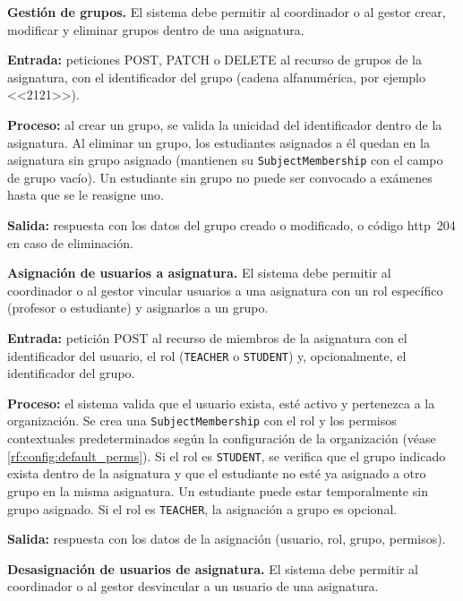 \begin{functional}
    \item \textbf{Gestión de grupos.} \label{rf:subjects:groups}
    El sistema debe permitir al coordinador o al gestor crear, modificar y eliminar grupos
    dentro de una asignatura.

    \textbf{Entrada:} peticiones POST, PATCH o DELETE al recurso de grupos de la
    asignatura, con el identificador del grupo (cadena alfanumérica, por ejemplo
    <<2121>>).

    \textbf{Proceso:} al crear un grupo, se valida la unicidad del identificador dentro de
    la asignatura. Al eliminar un grupo, los estudiantes asignados a él quedan en la
    asignatura sin grupo asignado (mantienen su \texttt{SubjectMembership} con el campo de
    grupo vacío). Un estudiante sin grupo no puede ser convocado a exámenes hasta que se le
    reasigne uno.

    \textbf{Salida:} respuesta con los datos del grupo creado o modificado, o código
    \acs{http}~204 en caso de eliminación.

    \item \textbf{Asignación de usuarios a asignatura.} \label{rf:subjects:assign}
    El sistema debe permitir al coordinador o al gestor vincular usuarios a una asignatura
    con un rol específico (profesor o estudiante) y asignarlos a un grupo.

    \textbf{Entrada:} petición POST al recurso de miembros de la asignatura con el
    identificador del usuario, el rol (\texttt{TEACHER} o \texttt{STUDENT}) y,
    opcionalmente, el identificador del grupo.

    \textbf{Proceso:} el sistema valida que el usuario exista, esté activo y pertenezca a la
    organización. Se crea una \texttt{SubjectMembership} con el rol y los permisos
    contextuales predeterminados según la configuración de la organización (véase
    \cref{rf:config:default_perms}). Si el rol es \texttt{STUDENT}, se verifica que el
    grupo indicado exista dentro de la asignatura y que el estudiante no esté ya asignado a
    otro grupo en la misma asignatura. Un estudiante puede estar temporalmente sin grupo
    asignado. Si el rol es \texttt{TEACHER}, la asignación a grupo es opcional.

    \textbf{Salida:} respuesta con los datos de la asignación (usuario, rol, grupo,
    permisos).

    \item \textbf{Desasignación de usuarios de asignatura.} \label{rf:subjects:unassign}
    El sistema debe permitir al coordinador o al gestor desvincular a un usuario de una
    asignatura.


\end{functional}
